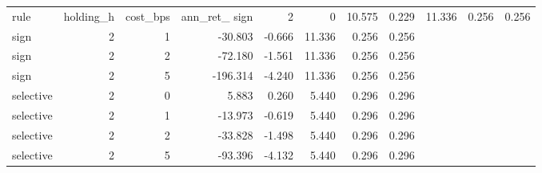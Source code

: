 \begin{tabular}{lrrrrrrr}
\toprule
rule & holding_h & cost_bps & ann_ret_%
\midrule
sign & 2 & 0 & 10.575 & 0.229 & 11.336 & 0.256 & 0.256 \\
sign & 2 & 1 & -30.803 & -0.666 & 11.336 & 0.256 & 0.256 \\
sign & 2 & 2 & -72.180 & -1.561 & 11.336 & 0.256 & 0.256 \\
sign & 2 & 5 & -196.314 & -4.240 & 11.336 & 0.256 & 0.256 \\
selective & 2 & 0 & 5.883 & 0.260 & 5.440 & 0.296 & 0.296 \\
selective & 2 & 1 & -13.973 & -0.619 & 5.440 & 0.296 & 0.296 \\
selective & 2 & 2 & -33.828 & -1.498 & 5.440 & 0.296 & 0.296 \\
selective & 2 & 5 & -93.396 & -4.132 & 5.440 & 0.296 & 0.296 \\
\bottomrule
\end{tabular}
